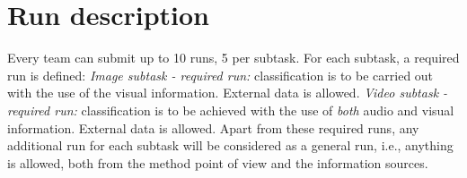 \documentclass[sigconf]{acmart-me}
\begin{document}


\vspace{-0.2cm}
\section{Run description}

Every team can submit up to 10 runs, 5 per subtask. For each subtask, a required run is defined: \emph{Image subtask - required run:} classification is to be carried out with the use of the visual information. External data is allowed. \emph{Video subtask - required run:} classification is to be achieved with the use of \emph{both} audio and visual information. External data is allowed.
Apart from these required runs, any additional run for each subtask will be considered as a general run, i.e., anything is allowed, both from the method point of view and the information sources. 
\end{document}

